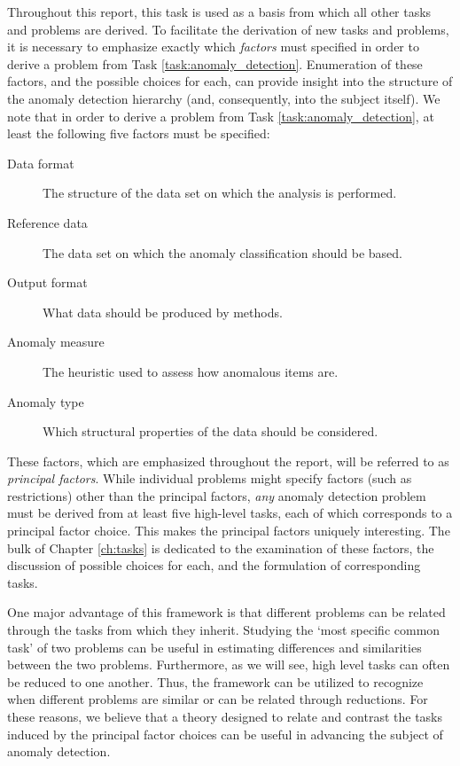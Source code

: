 Throughout this report, this task is used as a basis from which all other tasks and problems are derived. To facilitate the derivation of new tasks and problems, it is necessary to emphasize exactly which \emph{factors} must specified in order to derive a problem from Task \ref{task:anomaly_detection}. Enumeration of these factors, and the possible choices for each, can provide insight into the structure of the anomaly detection hierarchy (and, consequently, into the subject itself). We note that in order to derive a problem from Task \ref{task:anomaly_detection}, at least the following five factors must be specified:
\begin{description}
  \item[Data format] The structure of the data set on which the analysis is performed.
  \item[Reference data] The data set on which the anomaly classification should be based.
  \item[Output format] What data should be produced by methods.
  \item[Anomaly measure] The heuristic used to assess how anomalous items are.
  \item[Anomaly type] Which structural properties of the data should be considered. 
\end{description}
These factors, which are emphasized throughout the report, will be referred to as \emph{principal factors}. While individual problems might specify factors (such as restrictions) other than the principal factors, \emph{any} anomaly detection problem must be derived from at least five high-level tasks, each of which corresponds to a principal factor choice. This makes the principal factors uniquely interesting. The bulk of Chapter \ref{ch:tasks} is dedicated to the examination of these factors, the discussion of possible choices for each, and the formulation of corresponding tasks.

One major advantage of this framework is that different problems can be related through the tasks from which they inherit. Studying the `most specific common task' of two problems can be useful in estimating differences and similarities between the two problems. Furthermore, as we will see, high level tasks can often be reduced to one another. Thus, the framework can be utilized to recognize when different problems are similar or can be related through reductions. For these reasons, we believe that a theory designed to relate and contrast the tasks induced by the principal factor choices can be useful in advancing the subject of anomaly detection.

